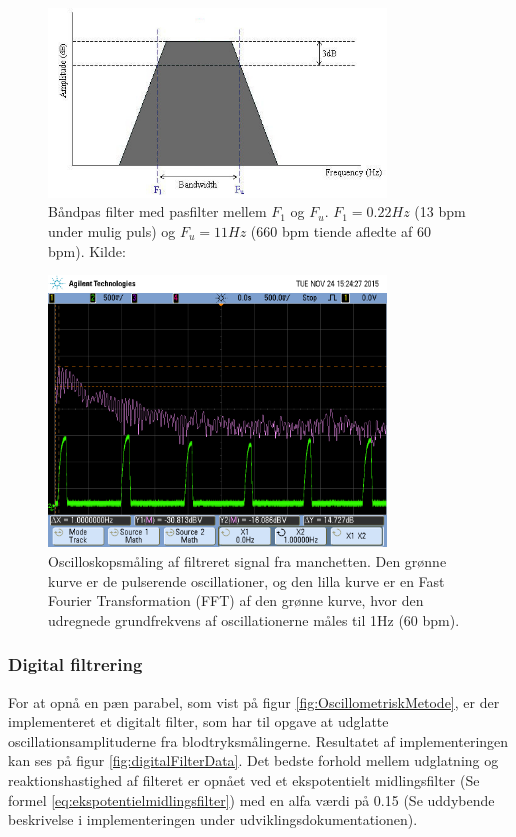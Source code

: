 \begin{figure}[H]
	\centering
	\includegraphics[trim={0 0 0 1.5cm},clip, width=0.8\textwidth]{billeder/BandPass_filter.JPG}
	\caption{Båndpas filter med pasfilter mellem $F_1$ og $F_u$. $F_1=0.22Hz$ (13 bpm under mulig puls) og $F_u=11Hz$ (660 bpm tiende afledte af 60 bpm). Kilde: \cite{Billede:4} }\label{fig:BandPassFilter}
\end{figure}

\begin{figure}[H]
	\centering
	\includegraphics[trim={0 2.5cm 0 1.5cm},clip, width=0.8\textwidth]{billeder/filteredPulseSignalWithFFT.png}
	\caption{Oscilloskopsmåling af filtreret signal fra manchetten. Den grønne kurve er de pulserende oscillationer, og den lilla kurve er en Fast Fourier Transformation (FFT) af den grønne kurve, hvor den udregnede grundfrekvens af oscillationerne måles til 1Hz (60 bpm).}\label{fig:filteredPulseSignalWithFFT}
\end{figure}

\subsubsection{Digital filtrering}
For at opnå en pæn parabel, som vist på  figur \ref{fig:OscillometriskMetode}, er der implementeret et digitalt filter, som har til opgave at udglatte oscillationsamplituderne fra blodtryksmålingerne. Resultatet af implementeringen kan ses på figur \ref{fig:digitalFilterData}. Det bedste forhold mellem udglatning og reaktionshastighed af filteret er opnået ved et ekspotentielt midlingsfilter (Se formel \ref{eq:ekspotentielmidlingsfilter}) med en alfa værdi på 0.15 (Se uddybende beskrivelse i implementeringen under udviklingsdokumentationen).  

